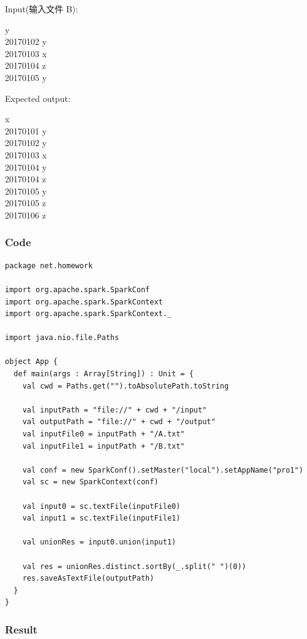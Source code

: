 \documentclass{article}
\begin{document}
    Input(输入文件 B):

     y \\
    20170102 y \\
    20170103 x \\
    20170104 z \\
    20170105 y

    Expected output:

     x \\
    20170101 y \\
    20170102 y \\
    20170103 x \\
    20170104 y \\
    20170104 z \\
    20170105 y \\
    20170105 z \\
    20170106 z

    \subsubsection{Code}

\begin{center}
\begin{verbatim}
package net.homework

import org.apache.spark.SparkConf
import org.apache.spark.SparkContext
import org.apache.spark.SparkContext._

import java.nio.file.Paths

object App {
  def main(args : Array[String]) : Unit = {
    val cwd = Paths.get("").toAbsolutePath.toString

    val inputPath = "file://" + cwd + "/input"
    val outputPath = "file://" + cwd + "/output"
    val inputFile0 = inputPath + "/A.txt"
    val inputFile1 = inputPath + "/B.txt"

    val conf = new SparkConf().setMaster("local").setAppName("pro1")
    val sc = new SparkContext(conf)

    val input0 = sc.textFile(inputFile0)
    val input1 = sc.textFile(inputFile1)

    val unionRes = input0.union(input1)

    val res = unionRes.distinct.sortBy(_.split(" ")(0))
    res.saveAsTextFile(outputPath)
  }
}
\end{verbatim}
\end{center}

    \subsubsection{Result}
\end{document}
